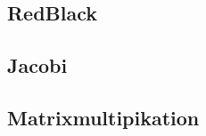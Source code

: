\begin{frame}
\end{frame}

\subsection{RedBlack}


\subsection{Jacobi}


\subsection{Matrixmultipikation}


